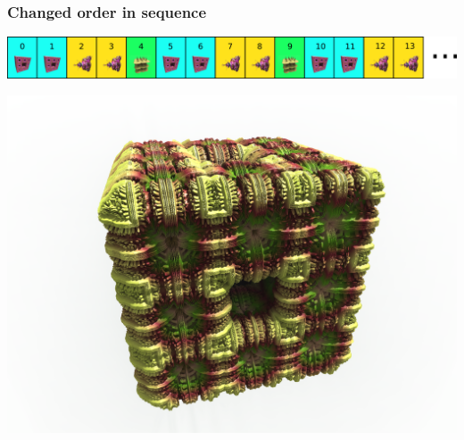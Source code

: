 \subsubsection{Changed order in sequence}

\includegraphics[width=\linewidth]{img/manual/media/iteration_loop_hybrid_sequence_5.png}

\includegraphics[width=0.5\linewidth]{img/manual/media/hybrid_sequence_example_5.png}
